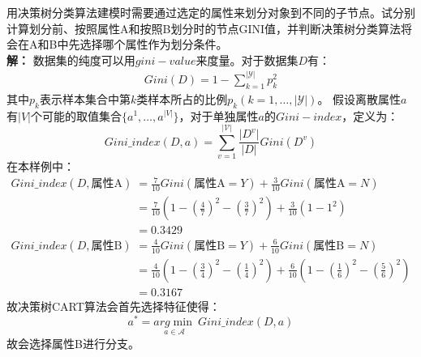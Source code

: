 \documentclass[twoside]{article}
\begin{document}
用决策树分类算法建模时需要通过选定的属性来划分对象到不同的子节点。试分别计算划分前、按照属性A和按照B划分时的节点GINI值，并判断决策树分类算法将会在A和B中先选择哪个属性作为划分条件。\\
\textbf{解：}
数据集的纯度可以用$gini-value$来度量。对于数据集$D$有：
\begin{equation*}
    \begin{aligned}
        Gini\left( D \right) =1-\sum_{k=1}^{\lvert \mathcal{Y} \rvert}{p_k^2}
    \end{aligned}
\end{equation*}
其中$p_k$表示样本集合中第$k$类样本所占的比例$p_k(k=1,\ldots,\lvert \mathcal{Y} \rvert)$。
假设离散属性$a$有$\lvert V \rvert$个可能的取值集合$\{a^1,\ldots,a^{|V|}\}$，对于单独属性$a$的$Gini-index$，定义为：
\begin{equation*}
    Gini\_index(D,a)=\sum_{v=1}^{\lvert \mathcal{V} \rvert} \frac{\lvert D^{v} \rvert}{\lvert D \rvert} Gini(D^{v})
\end{equation*}
在本样例中：
\begin{equation*}
    \begin{aligned}
        Gini\_index(D,\text{属性A})&= \frac{7}{10}Gini(\text{属性A}=Y)+\frac{3}{10}Gini(\text{属性A}=N)\\
        &=\frac{7}{10} \left(1-(\frac{4}{7})^2-(\frac{3}{7})^2\right)+\frac{3}{10}\left( 1-1^2\right)\\
        &=0.3429\\
        Gini\_index(D,\text{属性B})&= \frac{4}{10}Gini(\text{属性B}=Y)+\frac{6}{10}Gini(\text{属性B}=N)\\
        &=\frac{4}{10}\left(1-(\frac{3}{4})^2-(\frac{1}{4})^2\right)+\frac{6}{10}\left(1-(\frac{1}{6})^2-(\frac{5}{6})^2\right)\\
        &=0.3167
    \end{aligned}
\end{equation*}
故决策树CART算法会首先选择特征使得：
\begin{equation*}
    a^*=\underset{a\in \mathcal{A}}{arg\min}\ Gini\_index(D,a)
\end{equation*}
故会选择属性B进行分支。
\clearpage
{} \vspace{2mm} \\
\end{document}
